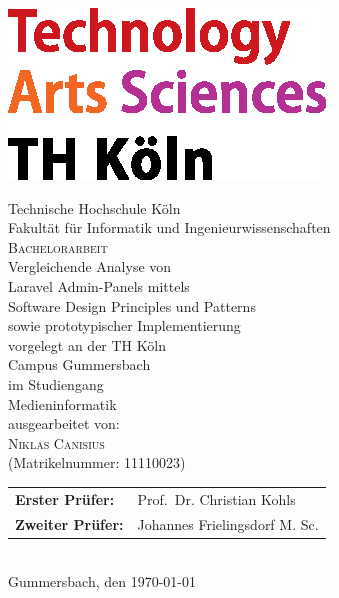 \pagestyle{empty}
\begin{titlepage}
    \includegraphics[scale=1.0]{assets/logo_TH-Koeln_CMYK_22pt}\\
    \begin{center}
        \large
        Technische Hochschule Köln\\
        Fakultät für Informatik und Ingenieurwissenschaften\\
        \vspace{1cm}
        \large
        \textsc{Bachelorarbeit}\\
        \vspace{1cm}
        \huge
        Vergleichende Analyse von\\
        Laravel Admin-Panels mittels\\
        Software Design Principles und Patterns\\
        sowie prototypischer Implementierung\\
        \vspace{1cm}
        \large
        vorgelegt an der TH Köln\\
        Campus Gummersbach\\
        im Studiengang\\
        Medieninformatik\\
        \vspace{1cm}
        ausgearbeitet von:\\
        \textsc{Niklas Canisius}\\
        (Matrikelnummer: 11110023)\\
        \vspace{1cm}
        \begin{tabular}{ll}
            \textbf{Erster Prüfer:} & Prof.\ Dr. Christian Kohls \\
            \textbf{Zweiter Prüfer:} & Johannes Frielingsdorf M. Sc. \\
        \end{tabular}
        \vspace{1cm}
        \\Gummersbach, den \today
    \end{center}
\end{titlepage}
